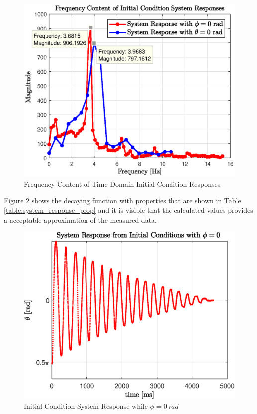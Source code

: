 \documentclass[a4paper,12pt]{article}
\begin{document}
	
	\begin{figure}[h]
		\centering
		\includegraphics[scale=1]{FFT_system.eps}
		\caption{Frequency Content of Time-Domain Initial Condition Responses}
		\label{fig:fft_system_response}
	\end{figure}
	
	Figure \ref{fig:q1_response} shows the decaying function with properties that are shown in Table \ref{table:system_response_prop} and it is visible that the calculated values provides a acceptable approximation of the measured data.
	
	\begin{figure}[h]
		\centering
		\includegraphics[scale=1]{q1_initial_response.eps}
		\caption{Initial Condition System Response while $ \phi = \SI{0}{rad} $ }
		\label{fig:q1_response}
	\end{figure}
		
\end{document}
